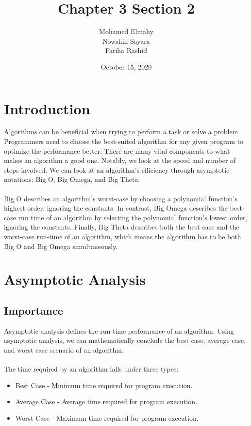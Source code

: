 \documentclass[]{article}
\theoremstyle{definition}
\begin{document}
\title{Chapter 3 \hspace{1mm} Section 2}
\author{Mohamed Elmahy \\ Nowshin Sayara \\ Fariha Rashid }

\date{October 15, 2020}

\maketitle




\section{Introduction}


Algorithms can be beneficial when trying to perform a task or solve a problem.  Programmers need to choose the best-suited algorithm for any given program to optimize the performance better. There are many vital components to what makes an algorithm a good one. Notably, we look at the speed and number of steps involved. We can look at an algorithm's efficiency through asymptotic notations: Big O, Big Omega, and Big Theta. \\ \\
Big O describes an algorithm's worst-case by choosing a polynomial function's highest order, ignoring the constants. In contrast, Big Omega describes the best-case run time of an algorithm by selecting the polynomial function's lowest order, ignoring the constants. Finally, Big Theta describes both the best case and the worst-case run-time of an algorithm, which means the algorithm has to be both Big O and Big Omega simultaneously.

\section{Asymptotic Analysis}

\label{sec:examples}




\subsection{Importance}
Asymptotic analysis defines the run-time performance of an algorithm. Using asymptotic analysis, we can mathematically conclude the best case, average case, and worst case scenario of an algorithm.\\ \\
The time required by an algorithm falls under three types:
\begin{itemize}
\item Best Case - Minimum time required for program execution.
\item Average Case - Average time required for program execution.
\item Worst Case - Maximum time required for program execution.
\end{itemize}\\
\newpage
\end{document}
